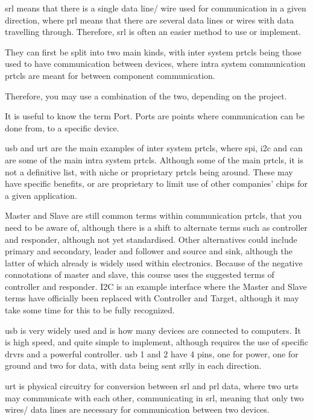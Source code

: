 \documentclass[a4paper,11pt]{report}
\begin{document}
\gls{srl} means that there is a single data line/ wire used for communication in a given direction, where \gls{prl} means that there are several data lines or wires with data travelling through. Therefore, \gls{srl} is often an easier method to use or implement.

They can first be split into two main kinds, with inter system \gls{prtcl}s being those used to have communication between devices, where intra system communication \gls{prtcl}s are meant for between component communication.

Therefore, you may use a combination of the two, depending on the project.

It is useful to know the term Port. Ports are points where communication can be done from, to a specific device.

\gls{usb} and \gls{urt} are the main examples of inter system \gls{prtcl}s, where \gls{spi}, \gls{i2c} and \gls{can} are some of the main intra system \gls{prtcl}s. Although some of the main \gls{prtcl}s, it is not a definitive list, with niche or proprietary \gls{prtcl}s being around. These may have specific benefits, or are proprietary to limit use of other companies' chips for a given application.

Master and Slave are still common terms within communication \gls{prtcl}s, that you need to be aware of, although there is a shift to alternate terms such as controller and responder, although not yet standardised. Other alternatives could include primary and secondary, leader and follower and source and sink, although the latter of which already is widely used within electronics. Because of the negative connotations of master and slave, this course uses the suggested terms of controller and responder. I2C is an example interface where the Master and Slave terms have officially been replaced with Controller and Target, although it may take some time for this to be fully recognized.

\gls{usb} is very widely used and is how many devices are connected to computers. It is high speed, and quite simple to implement, although requires the use of specific \gls{drvr}s and a powerful controller. \gls{usb} 1 and 2 have 4 pins, one for power, one for ground and two for data, with data being sent \gls{srl}ly in each direction.

\gls{urt} is physical circuitry for conversion between \gls{srl} and \gls{prl} data, where two \gls{urt}s may communicate with each other, communicating in \gls{srl}, meaning that only two wires/ data lines are necessary for communication between two devices.
\end{document}
